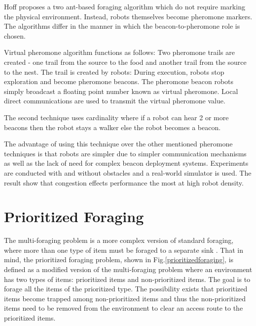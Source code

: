 Hoff \cite{hoff2010two} proposes a two ant-based foraging algorithm which do not require marking the physical environment. Instead, robots themselves become pheromone markers. The algorithms differ in the manner in which the beacon-to-pheromone role is chosen. 

Virtual pheromone algorithm functions as follows: Two pheromone trails are created - one trail from the source to the food and another trail from the source to the nest. The trail is created by robots: During execution, robots stop exploration and become pheromone beacons. The pheromone beacon robots simply broadcast a floating point number known as virtual pheromone. 
Local direct communications are used to transmit the virtual pheromone value.

The second technique uses cardinality where if a robot can hear 2 or more beacons then the robot stays a walker else the robot becomes a beacon. %


The advantage of using this technique over the other mentioned pheromone techniques is that robots are simpler due to simpler communication mechanisms as well as the lack of need for complex beacon deployment systems. Experiments are conducted with and without obstacles and a real-world simulator is used. The result show that congestion effects performance the most at high robot density. %









\section{Prioritized Foraging}
\label{sec:second:prioritizedforaging}


The multi-foraging problem is a more complex version of standard foraging, where more than one type of item must be foraged to a separate sink \cite{balch1999impact}. That in mind, the prioritized foraging problem, shown in Fig.\ref{prioritizedforaging}, is defined as a modified version of the multi-foraging problem where an environment has two types of items: prioritized items and non-prioritized items. The goal is to forage all the items of the prioritized type. The possibility exists that prioritized items become trapped among non-prioritized items and thus the non-prioritized items need to be removed from the environment to clear an access route to the prioritized items. 

